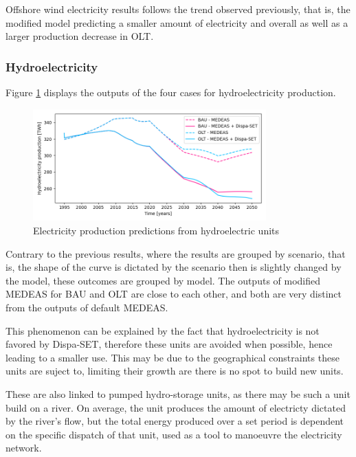 Offshore wind electricity results follows the trend observed previously, that is, the modified model predicting a smaller amount of electricity and overall as well as a larger production decrease in OLT.

\subsubsection{Hydroelectricity}

Figure \ref{fig:electricity-production-hydro} displays the outputs of the four cases for hydroelectricity production.

\begin{figure}[h]
    \centering
    \includegraphics[width=0.8\textwidth]{resources/images/electricity-production-hydro.png}
    \caption{Electricity production predictions from hydroelectric units}
    \label{fig:electricity-production-hydro}
\end{figure}

Contrary to the previous results, where the results are grouped by scenario, that is, the shape of the curve is dictated by the scenario then is slightly changed by the model, these outcomes are grouped by model. The outputs of modified MEDEAS for BAU and OLT are close to each other, and both are very distinct from the outputs of default MEDEAS.

This phenomenon can be explained by the fact that hydroelectricity is not favored by Dispa-SET, therefore these units are avoided when possible, hence leading to a smaller use. This may be due to the geographical constraints these units are suject to, limiting their growth are there is no spot to build new units.

These are also linked to pumped hydro-storage units, as there may be such a unit build on a river. On average, the unit produces the amount of electricty dictated by the river's flow, but the total energy produced over a set period is dependent on the specific dispatch of that unit, used as a tool to manoeuvre the electricity network.

